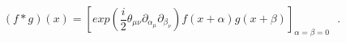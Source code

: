 \begin{equation} 
(f*g)(x) = [exp(\frac{i}{2} \theta_{\mu \nu}
\partial_{\alpha_{\mu}} \partial_{\beta_{\nu}})f(x + \alpha) g(x+
\beta)]_{\alpha=\beta=0} ~~~.
\end{equation}

